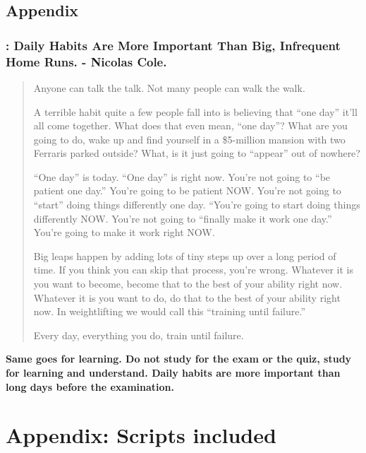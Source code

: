 \documentclass[xcolor=dvipsnames,11pt]{beamer}
\begin{document}
\subsection{Appendix}


\begin{frame}
\frametitle{\secname: Daily Habits Are More Important Than Big, Infrequent Home Runs. - Nicolas Cole.}

{\scriptsize 
\begin{quotation}


Anyone can talk the talk. Not many people can walk the walk.

A terrible habit quite a few people fall into is believing that ``one day'' it'll all come together. What does that even mean, ``one day''? What are you going to do, wake up and find yourself in a \$5-million mansion with two Ferraris parked outside? What, is it just going to ``appear'' out of nowhere?

``One day'' is today. ``One day'' is right now. You're not going to ``be patient one day.'' You're going to be patient NOW. You're not going to ``start'' doing things differently one day. ``You're going to start doing things differently NOW. You're not going to ``finally make it work one day.'' You're going to make it work right NOW.

Big leaps happen by adding lots of tiny steps up over a long period of time. If you think you can skip that process, you're wrong. Whatever it is you want to become, become that to the best of your ability right now. Whatever it is you want to do, do that to the best of your ability right now. In weightlifting we would call this ``training until failure.''

Every day, everything you do, train until failure.
\end{quotation}}

\vspace{-5pt}
{\footnotesize 
\textbf{Same goes for learning. Do not study for the exam or the quiz, study for learning and understand. Daily habits are more important than long days before the examination.} }


\end{frame}


\section{Appendix: Scripts included}
\end{document}
